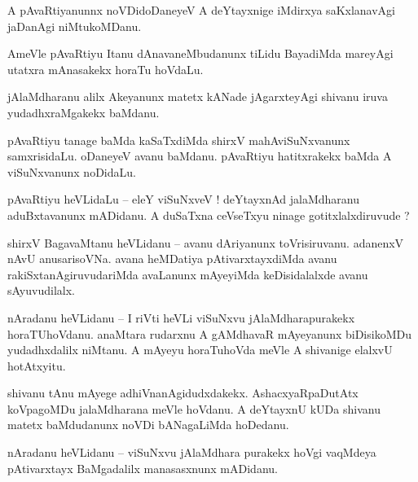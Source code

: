 \documentclass{article}
\begin{document}
\begin{mn}%
A pAvaRtiyanunnx noVDidoDaneyeV A deYtayxnige iMdirxya saKxlanavAgi jaDanAgi niMtukoMDanu.
\end{mn}

\begin{mn}%
AmeVle pAvaRtiyu Itanu dAnavaneMbudanunx tiLidu BayadiMda mareyAgi utatxra mAnasakekx horaTu hoVdaLu.
\end{mn}

\begin{mn}%
jAlaMdharanu alilx Akeyanunx matetx kANade jAgarxteyAgi shivanu iruva yudadhxraMgakekx baMdanu.
\end{mn}

\begin{mn}%
pAvaRtiyu tanage baMda kaSaTxdiMda shirxV mahAviSuNxvanunx samxrisidaLu. oDaneyeV avanu baMdanu. 
pAvaRtiyu hatitxrakekx baMda A viSuNxvanunx noDidaLu.
\end{mn}

\begin{mn}%
pAvaRtiyu heVLidaLu -- eleY viSuNxveV ! deYtayxnAd jalaMdharanu aduBxtavanunx mADidanu. A duSaTxna 
ceVseTxyu ninage gotitxlalxdiruvude ?
\end{mn}

\begin{mn}%
shirxV BagavaMtanu heVLidanu -- avanu dAriyanunx toVrisiruvanu. adanenxV nAvU anusarisoVNa. avana 
heMDatiya pAtivarxtayxdiMda avanu rakiSxtanAgiruvudariMda avaLanunx mAyeyiMda keDisidalalxde avanu 
sAyuvudilalx.
\end{mn}

\begin{mn}%
nAradanu heVLidanu -- I riVti heVLi viSuNxvu jAlaMdharapurakekx horaTUhoVdanu. anaMtara rudarxnu A 
gAMdhavaR mAyeyanunx biDisikoMDu yudadhxdalilx niMtanu. A mAyeyu horaTuhoVda meVle A shivanige 
elalxvU hotAtxyitu.
\end{mn}

\begin{mn}%
shivanu tAnu mAyege adhiVnanAgidudxdakekx. AshacxyaRpaDutAtx koVpagoMDu jalaMdharana meVle hoVdanu. 
A deYtayxnU kUDa shivanu matetx baMdudanunx noVDi bANagaLiMda hoDedanu.
\end{mn}


\begin{mn}%
nAradanu heVLidanu -- viSuNxvu jAlaMdhara purakekx hoVgi vaqMdeya pAtivarxtayx BaMgadalilx 
manasasxnunx mADidanu.
\end{mn}
\end{document}
